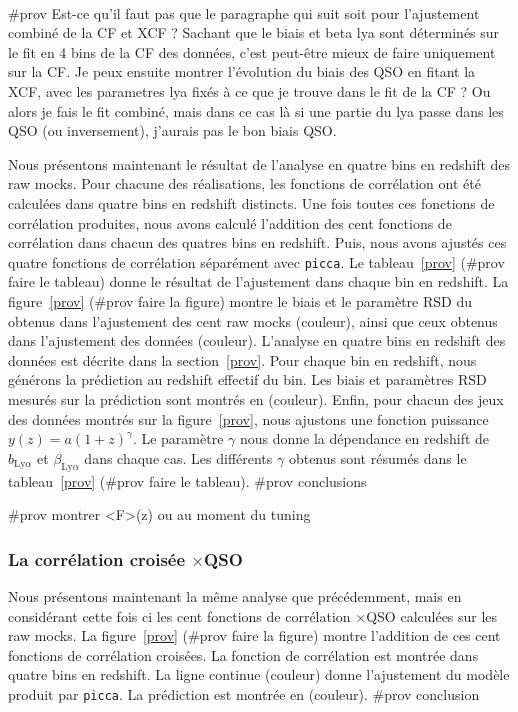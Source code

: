 \documentclass[11pt, twoside, a4paper, openright]{report}
\begin{document}
\paragraph{}
\#prov Est-ce qu'il faut pas que le paragraphe qui suit soit pour l'ajustement combiné de la CF et XCF ?
Sachant que le biais et beta lya sont déterminés sur le fit en 4 bins de la CF des données, c'est peut-être mieux de faire uniquement sur la CF. Je peux ensuite montrer l'évolution du biais des QSO en fitant la XCF, avec les parametres lya fixés à ce que je trouve dans le fit de la CF ? Ou alors je fais le fit combiné, mais dans ce cas là si une partie du lya passe dans les QSO (ou inversement), j'aurais pas le bon biais QSO.

Nous présentons maintenant le résultat de l'analyse en quatre bins en redshift des raw mocks. Pour chacune des réalisations, les fonctions de corrélation ont été calculées dans quatre bins en redshift distincts. Une fois toutes ces fonctions de corrélation produites, nous avons calculé l'addition des cent fonctions de corrélation dans chacun des quatres bins en redshift. Puis, nous avons ajustés ces quatre fonctions de corrélation séparément avec \texttt{picca}.
Le tableau~\ref{prov} (\#prov faire le tableau) donne le résultat de l'ajustement dans chaque bin en redshift.
La figure~\ref{prov} (\#prov faire la figure) montre le biais et le paramètre RSD du \lya{} obtenus dans l'ajustement des cent raw mocks (couleur), ainsi que ceux obtenus dans l'ajustement des données (couleur).
L'analyse en quatre bins en redshift des données est décrite dans la section~\ref{prov}. Pour chaque bin en redshift, nous générons la prédiction au redshift effectif du bin. Les biais et paramètres RSD mesurés sur la prédiction sont montrés en (couleur).
Enfin, pour chacun des jeux des données montrés sur la figure~\ref{prov}, nous ajustons une fonction puissance $y(z) = a (1+z)^{\gamma}$. Le paramètre $\gamma$ nous donne la dépendance en redshift de $b_{\mathrm{Ly}\alpha}$ et $\beta_{\mathrm{Ly}\alpha}$ dans chaque cas. Les différents $\gamma$ obtenus sont résumés dans le tableau~\ref{prov} (\#prov faire le tableau).
\#prov conclusions

\#prov montrer <F>(z) ou au moment du tuning

\subsubsection{La corrélation croisée \lya{}$\times$QSO}

Nous présentons maintenant la même analyse que précédemment, mais en considérant cette fois ci les cent fonctions de corrélation \lya{}$\times$QSO calculées sur les raw mocks. La figure~\ref{prov} (\#prov faire la figure) montre l'addition de ces cent fonctions de corrélation croisées. La fonction de corrélation est montrée dans quatre bins en redshift. La ligne continue (couleur) donne l'ajustement du modèle produit par \texttt{picca}. La prédiction est montrée en (couleur).
\#prov conclusion
\end{document}
